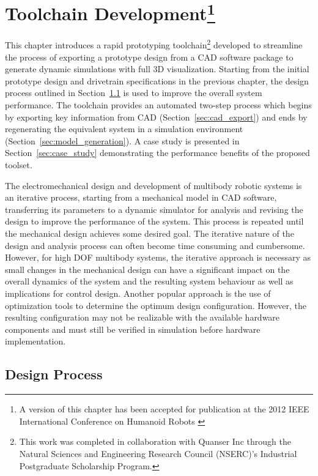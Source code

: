 \chapter[Toolchain Development]{Toolchain Development\footnote{A version of this chapter has been accepted for publication at the 2012 IEEE International Conference on Humanoid Robots \cite{ChoudhuryHumanoids2012}}} %
\label{cha:toolchain}

This chapter introduces a rapid prototyping toolchain\footnote{This work was completed in collaboration with Quanser Inc through the Natural Sciences and Engineering Research Council (NSERC)'s Industrial Postgraduate Scholarship Program.} developed to streamline the process of exporting a prototype design from a CAD software package to generate dynamic simulations with full 3D visualization. Starting from the initial prototype design and drivetrain specifications in the previous chapter, the design process outlined in Section~\ref{sec:design_process} is used to improve the overall system performance. The toolchain provides an automated two-step process which begins by exporting key information from CAD (Section~\ref{sec:cad_export}) and ends by regenerating the equivalent system in a simulation environment (Section~\ref{sec:model_generation}). A case study is presented in Section~\ref{sec:case_study} demonstrating the performance benefits of the proposed toolset. 

The electromechanical design and development of multibody robotic systems is an iterative process, starting from a mechanical model in CAD software, transferring its parameters to a dynamic simulator for analysis and revising the design to improve the performance of the system. This process is repeated until the mechanical design achieves some desired goal. The iterative nature of the design and analysis process can often become time consuming and cumbersome. However, for high DOF multibody systems, the iterative approach is necessary as small changes in the mechanical design can have a significant impact on the overall dynamics of the system and the resulting system behaviour as well as implications for control design. Another popular approach is the use of optimization tools \cite{Paul2001,Wollherr2002} to determine the optimum design configuration. However, the resulting configuration may not be realizable with the available hardware components and must still be verified in simulation before hardware implementation. 

\section{Design Process} %
\label{sec:design_process}

